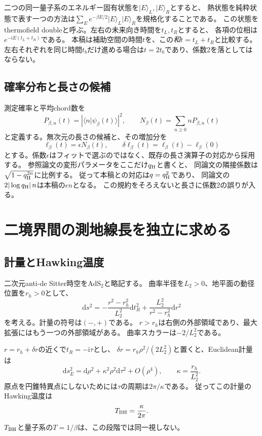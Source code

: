\documentclass[a4paper,11pt]{ltjsarticle}
\numberwithin{equation}{section}
\newcommand{\ket}[1]{\lvert#1\rangle}
\newcommand{\bra}[1]{\langle#1\rvert}
\newcommand{\dd}{\mathrm d}
\newcommand{\ii}{\mathrm i}
\begin{document}
二つの同一量子系のエネルギー固有状態を$\ket E_L,\ket E_R$とすると、
熱状態を純粋状態で表す一つの方法は$\sum_E e^{-\beta E/2}\ket E_L\ket E_R$を規格化することである。
この状態をthermofield doubleと呼ぶ。左右の未来向き時間を$t_L,t_R$とすると、
各項の位相は$e^{-\ii E(t_L+t_R)}$である。
本稿は補助空間の時間$t$を、この\emph{和}$t=t_L+t_R$と比較する。
左右それぞれを同じ時間$t_b$だけ進める場合は$t=2t_b$であり、係数2を落としてはならない。

\subsection{確率分布と長さの候補}
測定確率と平均chord数を
\begin{equation}
 P_{\beta,n}(t)=|\bra n\psi_\beta(t)\rangle|^2,\qquad
 N_\beta(t)=\sum_{n\geq0}nP_{\beta,n}(t)
 \label{eq:prob}
\end{equation}
と定義する。無次元の長さの候補と、その増加分を
\begin{equation}
 \ell_\beta(t)=\epsilon N_\beta(t),\qquad
 \delta\ell_\beta(t)=\ell_\beta(t)-\ell_\beta(0)
 \label{eq:lengthobs}
\end{equation}
とする。係数$\epsilon$はフィットで選ぶのではなく、既存の長さ演算子の対応から採用する\cite{Heller}。
参照論文の変形パラメータをここだけ$q_{\rm H}$と書くと、
同論文の隣接係数は$\sqrt{1-q_{\rm H}^{2n}}$に比例する。
従って本稿との対応は$q=q_{\rm H}^2$であり、
同論文の$2|\log q_{\rm H}|\,n$は本稿の$\epsilon n$となる。
この規約をそろえないと長さに係数2の誤りが入る。

\section{二境界間の測地線長を独立に求める}
\subsection{計量とHawking温度}
二次元anti-de Sitter時空をAdS$_2$と略記する。
曲率半径を$L_2>0$、地平面の動径位置を$r_h>0$として、
\begin{equation}
 \dd s^2=-\frac{r^2-r_h^2}{L_2^2}\dd t_R^2
 +\frac{L_2^2}{r^2-r_h^2}\dd r^2
 \label{eq:metric}
\end{equation}
を考える。計量の符号は$(-,+)$である。
$r>r_h$は右側の外部領域であり、最大拡張にはもう一つの外部領域がある。
曲率スカラーは$-2/L_2^2$である。

$r=r_h+\delta r$の近くで$t_R=-\ii\tau$とし、
$\delta r=r_h\rho^2/(2L_2^2)$と置くと、Euclidean計量は
\begin{equation}
 \dd s_E^2=\dd\rho^2+\kappa^2\rho^2\dd\tau^2+O(\rho^4),\qquad
 \kappa=\frac{r_h}{L_2^2}.
\end{equation}
原点を円錐特異点にしないためには$\tau$の周期は$2\pi/\kappa$である。
従ってこの計量のHawking温度は
\begin{equation}
 T_{\rm BH}=\frac{\kappa}{2\pi}.
 \label{eq:tbh}
\end{equation}
$T_{\rm BH}$と量子系の$T=1/\beta$は、この段階では同一視しない。
\end{document}
